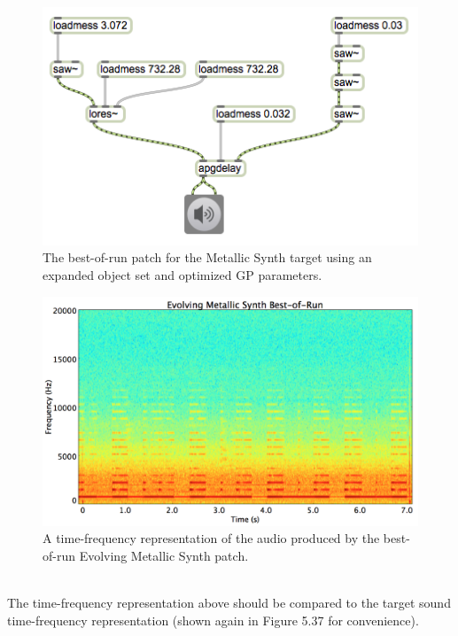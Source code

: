 \documentclass[12pt]{report} 	%
\numberwithin{figure}{chapter}
\numberwithin{table}{chapter}
\numberwithin{equation}{chapter}
\begin{document}
\begin{flushleft}
\begin{figure}[h!]
\begin{center}
\includegraphics[width=\linewidth]{MetallicSynth_Best}
\caption[Metallic synth best-of-run patch]{The best-of-run patch for the Metallic Synth target using an expanded object set and optimized GP parameters.}
\end{center}
\end{figure}
\begin{figure}[h!]
\begin{center}
\includegraphics[scale=0.35,width=\linewidth]{EvolvingMetallicSynthBestOfRun}
\caption[Best-of-run evolving metallic synth time-frequency representation]{A time-frequency representation of the audio produced by the best-of-run Evolving Metallic Synth patch.}
\end{center}
\end{figure}
\\
The time-frequency representation above should be compared to the target sound time-frequency representation (shown again in Figure 5.37 for convenience).

\end{flushleft}
\end{document}

